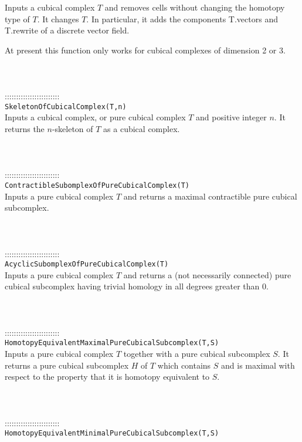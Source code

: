 \documentclass[a4paper,11pt]{report}
\begin{document}
{ Inputs a cubical complex $T$ and removes cells without changing the homotopy type of $T$. It changes $T$. In particular, it adds the components T.vectors and T.rewrite of a discrete
vector field. 

 At present this function only works for cubical complexes of dimension 2 or 3. \\
 \\
 \\
 \\
 ::::::::::::::::::::::::\\
 \texttt{SkeletonOfCubicalComplex(T,n)}\\
 

 Inputs a cubical complex, or pure cubical complex $T$ and positive integer $n$. It returns the $n$-skeleton of $T$ as a cubical complex. \\
 \\
 \\
 \\
 ::::::::::::::::::::::::\\
 \texttt{ContractibleSubomplexOfPureCubicalComplex(T)}\\
 

 Inputs a pure cubical complex $T$ and returns a maximal contractible pure cubical subcomplex. \\
 \\
 \\
 \\
 ::::::::::::::::::::::::\\
 \texttt{AcyclicSubomplexOfPureCubicalComplex(T)}\\
 

 Inputs a pure cubical complex $T$ and returns a (not necessarily connected) pure cubical subcomplex having
trivial homology in all degrees greater than $0$. \\
 \\
 \\
 \\
 ::::::::::::::::::::::::\\
 \texttt{HomotopyEquivalentMaximalPureCubicalSubcomplex(T,S)}\\
 

 Inputs a pure cubical complex $T$ together with a pure cubical subcomplex $S$. It returns a pure cubical subcomplex $H$ of $T$ which contains $S$ and is maximal with respect to the property that it is homotopy equivalent to $S$. \\
 \\
 \\
 \\
 ::::::::::::::::::::::::\\
 \texttt{HomotopyEquivalentMinimalPureCubicalSubcomplex(T,S)}\\
 

}
\end{document}
